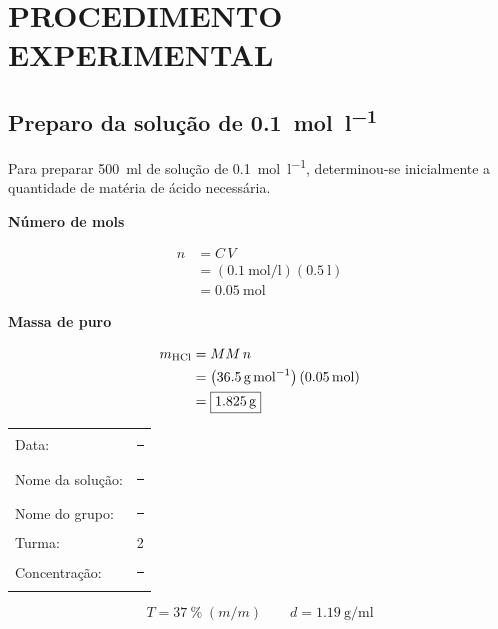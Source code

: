 \documentclass[a4paper,12pt]{article}
\newcommand{\subtitulo}[1]{%
  \par\medskip
  {\color{quadroazul}\bfseries\large #1}\par\smallskip
}
\begin{document}
\section{PROCEDIMENTO EXPERIMENTAL}

\subsection{Preparo da solução de  \qty{0.1}{\mole\per\litre}}

Para preparar \qty{500}{\milli\litre} de solução de 
\qty{0.1}{\mole\per\litre}, determinou-se inicialmente a quantidade de matéria de ácido necessária.

\subtitulo{Número de mols}

\begin{align*}
  n &= C\,V \\
    &= \left(\qty{0.1}{\mole\per\litre}\right)
       \left(\qty{0.5}{\litre}\right) \\
    &= \boxed{\qty{0.05}{\mole}}
\end{align*}

\subtitulo{Massa de  puro}

\begin{align*}
  m_{\ce{HCl}} &= MM\,n \\
    &= \left(\qty{36.5}{\gram\per\mole}\right)
       \left(\qty{0.05}{\mole}\right) \\
    &= \boxed{\qty{1.825}{\gram}}
\end{align*}

\begin{tcolorbox}[
  title=Etiqueta da solução,
  colback=quadrocinza,
  colframe=black!65,
  boxrule=0.6pt,
  arc=1mm
]
\begin{tabular}{@{}ll@{}}
Data: & \rule{4.0cm}{0.4pt}\\[1.3ex]
Nome da solução: & \rule{2.2cm}{0.4pt}\\[1.3ex]
Nome do grupo: & \rule{2.5cm}{0.4pt}\\[1.3ex]
Turma: & 2\\[1.3ex]
Concentração: & \rule{2.8cm}{0.4pt}
\end{tabular}
\end{tcolorbox}

\vspace{0.3cm}

\begin{tcolorbox}[
  title=Dados da solução concentrada de \ce{HCl},
  colback=quadrocinza,
  colframe=black!65,
  boxrule=0.6pt,
  arc=1mm
]
\[
  T = \qty{37}{\percent}\;(m/m)
  \qquad
  d = \qty{1.19}{\gram\per\milli\litre}
\]
\end{tcolorbox}
\end{document}
